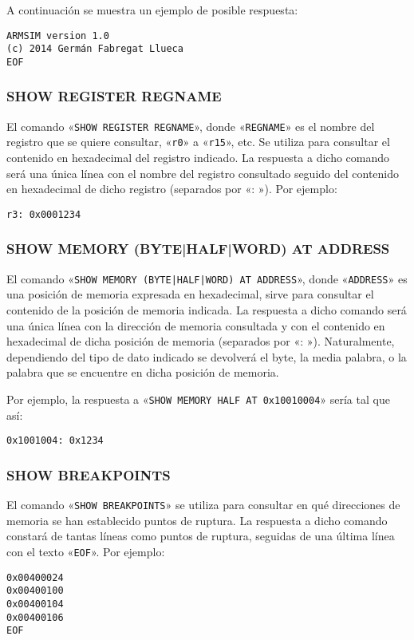 \documentclass[notitlepage,11pt,a4paper,final,twoside]{article}
\begin{document}
A continuación se muestra un ejemplo de posible respuesta:
\begin{lstlisting}
ARMSIM version 1.0
(c) 2014 Germán Fabregat Llueca
EOF
\end{lstlisting}


\subsubsection{SHOW REGISTER REGNAME}

El comando «\texttt{SHOW REGISTER REGNAME}», donde «\texttt{REGNAME}»
es el nombre del registro que se quiere consultar, «\texttt{r0}» a
«\texttt{r15}», etc. Se utiliza para consultar el contenido en
hexadecimal del registro indicado. La respuesta a dicho comando será
una única línea con el nombre del registro consultado seguido del
contenido en hexadecimal de dicho registro (separados por «: »). Por
ejemplo:
\begin{lstlisting}
r3: 0x0001234
\end{lstlisting}


\subsubsection{SHOW MEMORY (BYTE|HALF|WORD) AT ADDRESS}

El comando «\texttt{SHOW MEMORY (BYTE|HALF|WORD) AT ADDRESS}», donde
«\texttt{ADDRESS}» es una posición de memoria expresada en
hexadecimal, sirve para consultar el contenido de la posición de
memoria indicada. La respuesta a dicho comando será una única línea
con la dirección de memoria consultada y con el contenido en
hexadecimal de dicha posición de memoria (separados por «:
»). Naturalmente, dependiendo del tipo de dato indicado se devolverá
el byte, la media palabra, o la palabra que se encuentre en dicha
posición de memoria.

Por ejemplo, la respuesta a «\texttt{SHOW MEMORY HALF AT 0x10010004}»
sería tal que así:
\begin{lstlisting}
0x1001004: 0x1234
\end{lstlisting}

\subsubsection{SHOW BREAKPOINTS}

El comando «\texttt{SHOW BREAKPOINTS}» se utiliza para consultar en
qué direcciones de memoria se han establecido puntos de ruptura. La
respuesta a dicho comando constará de tantas líneas como puntos de
ruptura, seguidas de una última línea con el texto «\texttt{EOF}». Por
ejemplo:
\begin{lstlisting}
0x00400024
0x00400100
0x00400104
0x00400106
EOF
\end{lstlisting}
\end{document}
